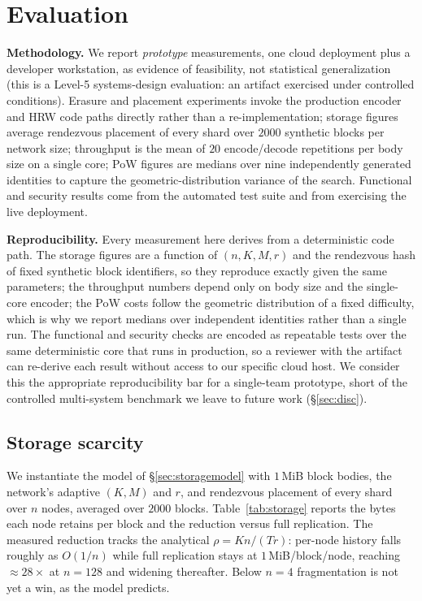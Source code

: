 \section{Evaluation}
\label{sec:eval}
\textbf{Methodology.} We report \emph{prototype} measurements, one cloud deployment plus a
developer workstation, as evidence of feasibility, not statistical generalization
(this is a Level-5 systems-design evaluation: an artifact exercised under controlled
conditions). Erasure and placement experiments invoke the production encoder and HRW code paths
directly rather than a re-implementation; storage figures average rendezvous placement of every
shard over $2000$ synthetic blocks per network size; throughput is the mean of $20$ encode/decode
repetitions per body size on a single core; PoW figures are medians over nine independently
generated identities to capture the geometric-distribution variance of the search. Functional and
security results come from the automated test suite and from exercising the live deployment.

\textbf{Reproducibility.} Every measurement here derives from a deterministic code path. The storage
figures are a function of $(n,K,M,r)$ and the rendezvous hash of fixed synthetic block identifiers,
so they reproduce exactly given the same parameters; the throughput numbers depend only on body size
and the single-core encoder; the PoW costs follow the geometric distribution of a fixed difficulty,
which is why we report medians over independent identities rather than a single run. The functional
and security checks are encoded as repeatable tests over the same deterministic core that runs in
production, so a reviewer with the artifact can re-derive each result without access to our specific
cloud host. We consider this the appropriate reproducibility bar for a single-team prototype, short
of the controlled multi-system benchmark we leave to future work (\S\ref{sec:disc}).

\subsection{Storage scarcity}
We instantiate the model of \S\ref{sec:storagemodel} with $1$\,MiB block bodies, the network's
adaptive $(K,M)$ and $r$, and rendezvous placement of every shard over $n$ nodes, averaged over
$2000$ blocks. Table~\ref{tab:storage} reports the bytes each node retains per block and the
reduction versus full replication. The measured reduction tracks the analytical $\rho=Kn/(Tr)$:
per-node history falls roughly as $O(1/n)$ while full replication stays at $1$\,MiB/block/node,
reaching $\approx 28\times$ at $n{=}128$ and widening thereafter. Below $n{=}4$ fragmentation is
not yet a win, as the model predicts.

